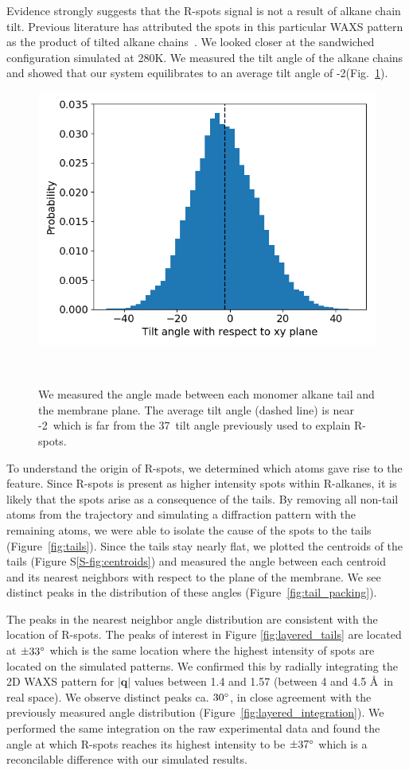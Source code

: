 \documentclass[journal=jpcbfk,manusciprt=article]{achemso}
\begin{document}
  Evidence strongly suggests that the R-spots signal is not a result of alkane chain tilt. Previous literature
  has attributed the spots in this particular WAXS pattern as the product of tilted alkane
  chains~\cite{feng_scalable_2014}. We looked closer at the sandwiched configuration simulated
  at 280K. We measured the tilt angle of the alkane chains and showed that our system 
  equilibrates to an average tilt angle of -2\degree (Fig.~\ref{fig:tilt}). 
  
  \begin{figure}[!htb]
  \centering
  \includegraphics[width=0.5\linewidth]{tilt_dist.png}
  \caption{We measured the angle made between each monomer alkane tail and the
	  membrane plane. The average tilt angle (dashed line) is near -2\degree~which is far from 
	  the 37\degree~tilt angle previously used to explain R-spots.}~\label{fig:tilt}
  \end{figure}

  To understand the origin of R-spots, we determined which
  atoms gave rise to the feature. Since R-spots is present as higher intensity
  spots within R-alkanes, it is likely that the spots arise as a consequence of
  the tails. By removing all non-tail atoms from the trajectory and simulating a
  diffraction pattern with the remaining atoms, we were able to isolate the cause of 
  the spots to the tails (Figure~\ref{fig:tails}). Since the tails stay nearly flat, we plotted
  the centroids of the tails (Figure S\ref{S-fig:centroids}) and measured the angle
  between each centroid and its nearest neighbors with respect to the plane of the 
  membrane. We see distinct peaks in the distribution of these angles 
  (Figure~\ref{fig:tail_packing}).

  The peaks in the nearest neighbor angle distribution are consistent with the
  location of R-spots. The peaks of interest in Figure \ref{fig:layered_tails}
  are located at $\pm 33 \degree$ which is the same location where the highest
  intensity of spots are located on the simulated patterns. We confirmed this 
  by radially integrating the 2D WAXS pattern for 
  $\left|\mathbf{q}\right|$ values between 1.4 and 1.57 (between 4
  and 4.5 \AA~in real space). We observe distinct peaks ca. $30
  \degree$, in close agreement with the previously measured angle distribution
  (Figure~\ref{fig:layered_integration}). We performed the same integration on
  the raw experimental data and found the angle at which R-spots reaches its
  highest intensity to be $\pm 37 \degree$ which is a reconcilable difference
  with our simulated results.
\end{document}
